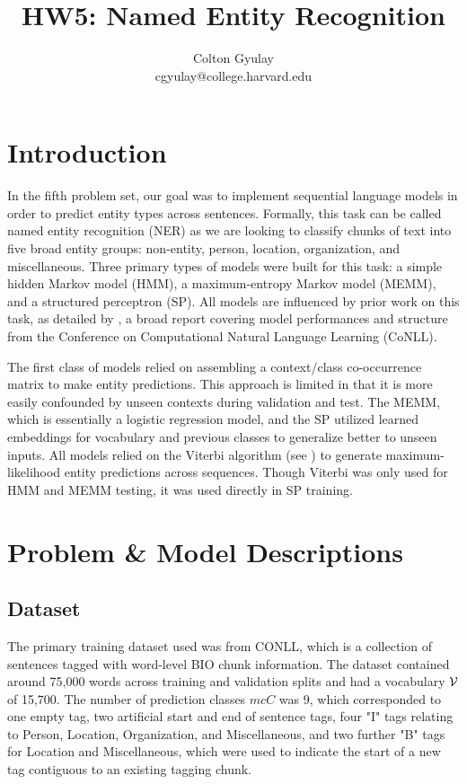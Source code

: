 \documentclass[11pt]{article}
\title{HW5: Named Entity Recognition}
\author{Colton Gyulay \\ cgyulay@college.harvard.edu }
\begin{document}
\maketitle{}
\section{Introduction}

In the fifth problem set, our goal was to implement sequential language models in order to predict entity types across sentences. Formally, this task can be called named entity recognition (NER) as we are looking to classify chunks of text into five broad entity groups: non-entity, person, location, organization, and miscellaneous. Three primary types of models were built for this task: a simple hidden Markov model (HMM), a maximum-entropy Markov model (MEMM), and a structured perceptron (SP). All models are influenced by prior work on this task, as detailed by \citet{tjong2003introduction}, a broad report covering model performances and structure from the Conference on Computational Natural Language Learning (CoNLL).

The first class of models relied on assembling a context/class co-occurrence matrix to make entity predictions. This approach is limited in that it is more easily confounded by unseen contexts during validation and test. The MEMM, which is essentially a logistic regression model, and the SP utilized learned embeddings for vocabulary and previous classes to generalize better to unseen inputs. All models relied on the Viterbi algorithm (see \citet{DBLP:journals/corr/abs-cs-0504020}) to generate maximum-likelihood entity predictions across sequences. Though Viterbi was only used for HMM and MEMM testing, it was used directly in SP training.

\section{Problem \& Model Descriptions}

\subsection{Dataset}

The primary training dataset used was from CONLL, which is a collection of sentences tagged with word-level BIO chunk information. The dataset contained around 75,000 words across training and validation splits and had a vocabulary $\mathcal{V}$ of 15,700. The number of prediction classes $mcC$ was 9, which corresponded to one empty tag, two artificial start and end of sentence tags, four "I" tags relating to Person, Location, Organization, and Miscellaneous, and two further "B" tags for Location and Miscellaneous, which were used to indicate the start of a new tag contiguous to an existing tagging chunk.
\end{document}
